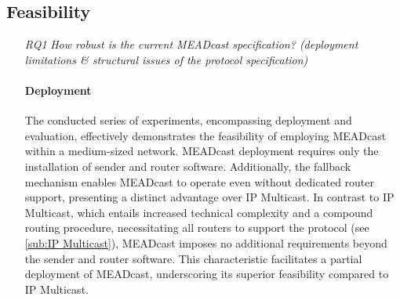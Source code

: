 \subsection{Feasibility} %
\label{sub:discussion_Feasibility}
\begin{itemize}
\item[\textit{RQ1}]
    \textit{How robust is the current MEADcast specification? (deployment
        limitations \& structural issues of the protocol specification)}\par
    \paragraph{Deployment}
    The conducted series of experiments, encompassing deployment and evaluation,
        effectively demonstrates the feasibility of employing MEADcast within a
        medium-sized network.
    MEADcast deployment requires only the installation of sender and router
        software.
    Additionally, the fallback mechanism enables MEADcast to operate even
        without dedicated router support, presenting a distinct advantage over
        IP Multicast.
    In contrast to IP Multicast, which entails increased technical complexity
        and a compound routing procedure, necessitating all routers to support
        the protocol (see \autoref{sub:IP Multicast}), MEADcast imposes no
        additional requirements beyond the sender and router software.
    This characteristic facilitates a partial deployment of MEADcast,
        underscoring its superior feasibility compared to IP Multicast.


\end{itemize}
